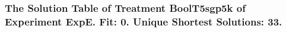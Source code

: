  \begin{frame}
 \fontsize{8pt}{9pt}\selectfont
 \frametitle{ The Solution Table of Treatment BoolT5sgp5k of Experiment ExpE. Fit: 0. Unique Shortest Solutions: 33. }

 \label{ExpESolutionTable008.tex}  
 \end{frame}

